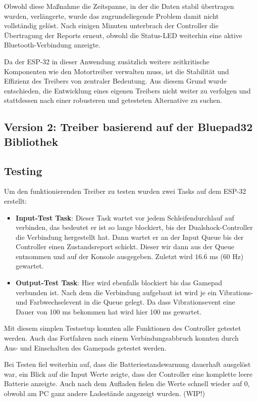 Obwohl diese Maßnahme die Zeitspanne, in der die Daten stabil übertragen wurden, verlängerte, wurde das zugrundeliegende Problem damit nicht vollständig gelöst. 
Nach einigen Minuten unterbrach der Controller die Übertragung der Reports erneut, obwohl die Status-LED weiterhin eine aktive Bluetooth-Verbindung anzeigte.

Da der ESP-32 in dieser Anwendung zusätzlich weitere zeitkritische Komponenten wie den Motortreiber verwalten muss, ist die Stabilität und Effizienz des Treibers von zentraler Bedeutung.
Aus diesem Grund wurde entschieden, die Entwicklung eines eigenen Treibers nicht weiter zu verfolgen und stattdessen nach einer robusteren und getesteten Alternative zu suchen.

\subsection{Version 2: Treiber basierend auf der Bluepad32 Bibliothek}

\subsection{Testing}

Um den funktionierenden Treiber zu testen wurden zwei Tasks auf dem ESP-32 erstellt:

\begin{itemize}
    \item \textbf{Input-Test Task}: Dieser Task wartet vor jedem Schleifendurchlauf auf verbinden, das bedeutet er ist so lange blockiert, bis der Dualshock-Controller die Verbindung hergestellt hat.
    Dann wartet er an der Input Queue bis der Controller einen Zustandsreport schickt. Dieser wir dann aus der Queue entnommen und auf der Konsole ausgegeben. Zuletzt wird $16.\overline{6}$ ms (60 Hz) gewartet.
    \item \textbf{Output-Test Task}: Hier wird ebenfalls blockiert bis das Gamepad verbunden ist. Nach dem die Verbindung aufgebaut ist wird je ein Vibrations- und Farbwechselevent in die Queue gelegt. 
    Da dass Vibrationsevent eine Dauer von 100 ms bekommen hat wird hier 100 ms gewartet.
\end{itemize}

Mit diesem simplen Testsetup konnten alle Funktionen des Controller getestet werden. 
Auch das Fortfahren nach einem Verbindungsabbruch konnten durch Aus- und Einschalten des Gamepads getestet werden. 

Bei Testen fiel weiterhin auf, dass die Batteriestandswarnung dauerhaft ausgelöst war, ein Blick auf die Input Werte zeigte, dass der Controller eine komplette leere Batterie anzeigte. 
Auch nach dem Aufladen fielen die Werte schnell wieder auf 0, obwohl am PC ganz andere Ladestände angezeigt wurden. (WIP!)

